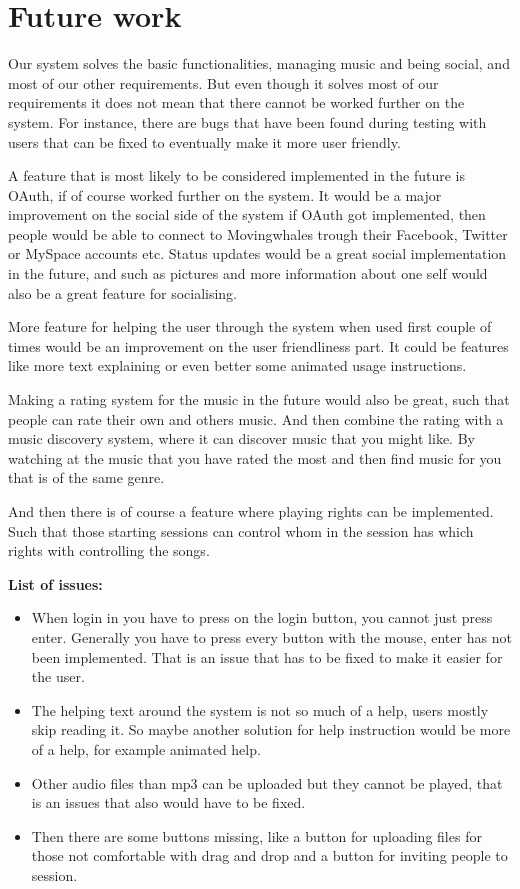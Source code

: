 \section{Future work}
Our system solves the basic functionalities, managing music and being social, and most of our other requirements. But even though it solves most of our requirements it does not mean that there cannot be worked further on the system. For instance, there are bugs that have been found during testing with users that can be fixed to eventually make it more user friendly.

A feature that is most likely to be considered implemented in the future is OAuth, if of course worked further on the system. It would be a major improvement on the social side of the system if OAuth got implemented, then people would be able to connect to Movingwhales trough their Facebook, Twitter or MySpace accounts etc. Status updates would be a great social implementation in the future, and such as pictures and more information about one self would also be a great feature for socialising.  

More feature for helping the user through the system when used first couple of times would be an improvement on the user friendliness part. It could be features like more text explaining or even better some animated usage instructions.

Making a rating system for the music in the future would also be great, such that people can rate their own and others music. And then combine the rating with a music discovery system, where it can discover music that you might like. By watching at the music that you have rated the most and then find music for you that is of the same genre.

And then there is of course a feature where playing rights can be implemented. Such that those starting sessions can control whom in the session has which rights with controlling the songs.

\textbf{List of issues:}
\begin{itemize}
\item When login in you have to press on the login button, you cannot just press enter. Generally you have to press every button with the mouse, enter has not been implemented. That is an issue that has to be fixed to make it easier for the user.
\item The helping text around the system is not so much of a help, users mostly skip reading it. So maybe another solution for help instruction would be more of a help, for example animated help.
\item Other audio files than mp3 can be uploaded but they cannot be played, that is an issues that also would have to be fixed.
\item Then there are some buttons missing, like a button for uploading files for those not comfortable with drag and drop and a button for inviting people to session.
\end{itemize}